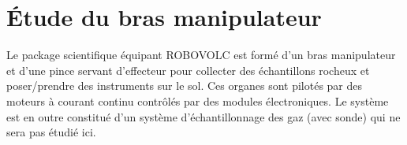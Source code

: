 \section{Étude du bras manipulateur}
 Le package scientifique équipant ROBOVOLC est formé d'un bras manipulateur et d'une pince
 servant d'effecteur pour collecter des échantillons rocheux et poser/prendre des instruments sur le
 sol. Ces organes sont pilotés par des moteurs à courant continu contrôlés par des modules
 électroniques. Le système est en outre constitué d'un système d'échantillonnage des gaz (avec
 sonde) qui ne sera pas étudié ici. 